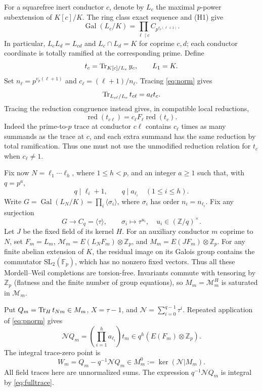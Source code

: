 \documentclass[11pt]{article}
\theoremstyle{definition}\newtheorem{definition}[theorem]{Definition}
\theoremstyle{remark}\newtheorem{remark}[theorem]{Remark}
\newcommand{\Zp}{\mathbb Z_p}\newcommand{\Qp}{\mathbb Q_p}
\newcommand{\Gal}{\operatorname{Gal}}\newcommand{\Res}{\operatorname{Res}}
\newcommand{\red}{\operatorname{red}}\newcommand{\ord}{\operatorname{ord}}
\begin{document}
For a squarefree inert conductor $c$, denote by $L_c$ the maximal $p$-power subextension of $K[c]/K$. The ring class exact sequence and (H1) give
\[
 \Gal(L_c/K)=\prod_{\ell\mid c} C_{p^{v_p(\ell+1)}}.
\]
In particular, $L_cL_d=L_{cd}$ and $L_c\cap L_d=K$ for coprime $c,d$; each conductor coordinate is totally ramified at the corresponding prime. Define
\[
 t_c=\operatorname{Tr}_{K[c]/L_c}y_c,\qquad L_1=K.
\]
Set $n_\ell=p^{v_p(\ell+1)}$ and $c_\ell=(\ell+1)/n_\ell$. Tracing \eqref{eq:norm} gives
\begin{equation}\label{eq:pnorm}
 \operatorname{Tr}_{L_{c\ell}/L_c}t_{c\ell}=a_\ell t_c.
\end{equation}
Tracing the reduction congruence instead gives, in compatible local reductions,
\begin{equation}\label{eq:pred}
 \red(t_{c\ell})=c_\ell F_\ell\red(t_c).
\end{equation}
Indeed the prime-to-$p$ trace at conductor $c\ell$ contains $c_\ell$ times as many summands as the trace at $c$, and each extra summand has the same reduction by total ramification. Thus one must not use the unmodified reduction relation for $t_c$ when $c_\ell\ne1$.

Fix now $N=\ell_1\cdots\ell_h$, where $1\le h<p$, and an integer $a\ge1$ such that, with $q=p^a$,
\begin{equation}\label{eq:old}
 q\mid \ell_i+1,\qquad q\mid a_{\ell_i}\quad(1\le i\le h).
\end{equation}
Write $G=\Gal(L_N/K)=\prod_i\langle\sigma_i\rangle$, where $\sigma_i$ has order $n_i=n_{\ell_i}$. Fix any surjection
\[
 G\longrightarrow C_q=\langle\tau\rangle,\qquad \sigma_i\longmapsto\tau^{u_i},\quad u_i\in(\mathbb Z/q)^\times.
\]
Let $J$ be the fixed field of its kernel $H$. For an auxiliary conductor $m$ coprime to $N$, set $F_m=L_m$, $\mathcal M_m=E(L_NF_m)\otimes\Zp$, and $M_m=E(JF_m)\otimes\Zp$. For any finite abelian extension of $K$, the residual image on its Galois group contains the commutator $\mathrm{SL}_2(\mathbb F_p)$, which has no nonzero fixed vectors. Thus all these Mordell--Weil completions are torsion-free. Invariants commute with tensoring by $\Zp$ (flatness and the finite number of group equations), so $M_m=\mathcal M_m^H$ is saturated in $\mathcal M_m$.

Put $Q_m=\operatorname{Tr}_Ht_{Nm}\in M_m$, $X=\tau-1$, and $\mathcal N=\sum_{i=0}^{q-1}\tau^i$. Repeated application of \eqref{eq:pnorm} gives
\begin{equation}\label{eq:fulltrace}
 \mathcal N Q_m=\left(\prod_{i=1}^h a_{\ell_i}\right)t_m\in q^h(E(F_m)\otimes\Zp).
\end{equation}
The integral trace-zero point is
\begin{equation}\label{eq:W}
 W_m=Q_m-q^{-1}\mathcal NQ_m\in M_m^0:=\ker(\mathcal N|M_m).
\end{equation}
All field traces here are unnormalized sums. The expression $q^{-1}\mathcal NQ_m$ is integral by \eqref{eq:fulltrace}.
\end{document}
